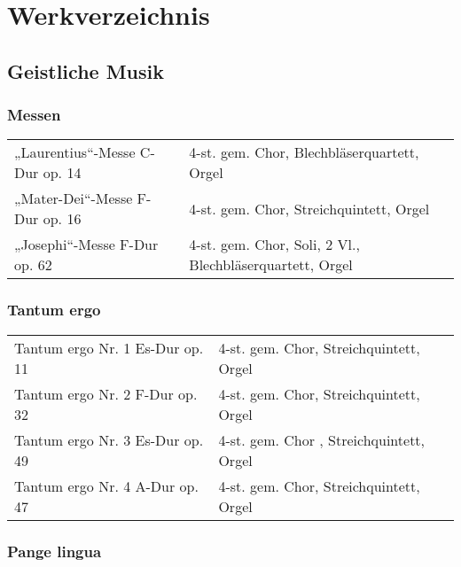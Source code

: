 \section{Werkverzeichnis}

\subsection{Geistliche Musik}

\newcommand{\klein}[1]{\tiny#1}

\newenvironment{tabelle}{\begin{tabular}{p{8cm}l}}{\end{tabular}}

\subsubsection{Messen}

\begin{tabelle}
„Laurentius“-Messe C-Dur op. 14 &
\klein{4-st. gem. Chor, Blechbläserquartett, Orgel}\\

„Mater-Dei“-Messe F-Dur op. 16 &
\klein{4-st. gem. Chor, Streichquintett, Orgel}\\

„Josephi“-Messe F-Dur op. 62 &
\klein{4-st. gem. Chor, Soli, 2 Vl., Blechbläserquartett, Orgel}\\
\end{tabelle}

\subsubsection{Tantum ergo}

\begin{tabelle}
Tantum ergo Nr. 1 Es-Dur op. 11 &
\klein{4-st. gem. Chor, Streichquintett, Orgel}\\

Tantum ergo Nr. 2 F-Dur op. 32 &
\klein{4-st. gem. Chor, Streichquintett, Orgel}\\

Tantum ergo Nr. 3 Es-Dur op. 49 &
\klein{4-st. gem. Chor , Streichquintett, Orgel}\\

Tantum ergo Nr. 4 A-Dur op. 47 &
\klein{4-st. gem. Chor, Streichquintett, Orgel}\\
\end{tabelle}

\subsubsection{Pange lingua}

